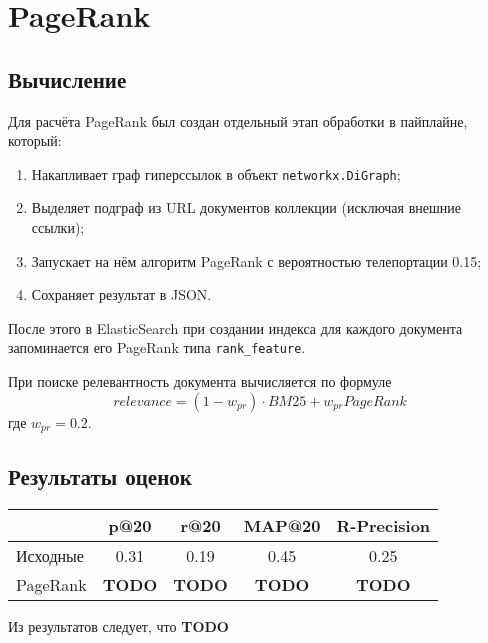 \section{PageRank}

\subsection{Вычисление}

Для расчёта PageRank был создан отдельный этап обработки в пайплайне, который:
\begin{enumerate}
	\item Накапливает граф гиперссылок в объект \texttt{networkx.DiGraph};
	\item Выделяет подграф из URL документов коллекции (исключая внешние ссылки);
	\item Запускает на нём алгоритм PageRank с вероятностью телепортации 0.15;
	\item Сохраняет результат в JSON.
\end{enumerate}

После этого в ElasticSearch при создании индекса для каждого документа запоминается его PageRank типа \texttt{rank\_feature}.

 При поиске релевантность документа вычисляется по формуле 
 $$ relevance = (1 - w_{pr}) \cdot BM25 + w_{pr} PageRank$$
 где $w_{pr} = 0.2$.
 
 \subsection{Результаты оценок}
 \begin{center}
 	\begin{tabular}{l|cccc}
 		& p@20 & r@20 & MAP@20 & R-Precision\\
 		\hline
 		Исходные & 0.31 & 0.19 & 0.45 & 0.25\\
 		PageRank & {\bf TODO} & {\bf TODO} & {\bf TODO} & {\bf TODO}\\
 		\end{tabular}
\end{center}

Из результатов следует, что \textbf{TODO}